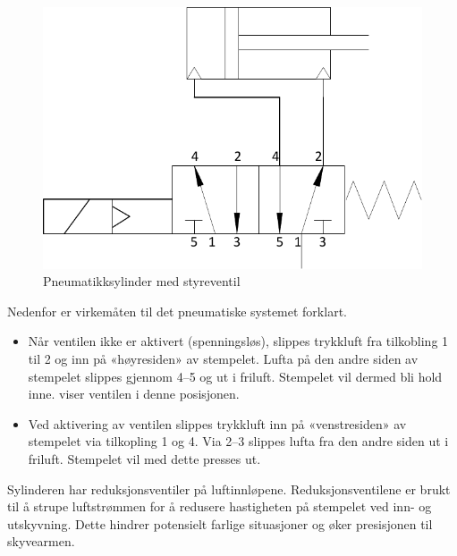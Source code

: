 \documentclass[Visionprosjekt.tex]{subfiles}
\begin{document}
\begin{figure}[ht]
\centering
		\includegraphics[scale=0.7]{bilder/luftstyring.pdf}
	\caption{Pneumatikksylinder med styreventil}
	\label{fig:luftvent}
\end{figure}







\newpage
Nedenfor er virkemåten til det pneumatiske systemet forklart.
\begin{itemize}
	\item Når ventilen ikke er aktivert (spenningsløs), slippes trykkluft fra tilkobling 1 til 2 og inn på «høyresiden» av stempelet. Lufta på den andre siden av stempelet slippes gjennom 4--5 og ut i friluft. Stempelet vil dermed bli hold inne.  viser ventilen i denne posisjonen.
  \item  Ved aktivering av ventilen slippes trykkluft inn på «venstresiden» av stempelet via tilkopling 1 og 4. Via 2--3 slippes lufta fra den andre siden  ut i friluft. Stempelet vil med dette presses ut. 
\end{itemize}

Sylinderen har reduksjonsventiler på luftinnløpene. Reduksjonsventilene er brukt til å strupe luftstrømmen for å redusere hastigheten på stempelet ved inn- og utskyvning. Dette hindrer potensielt farlige situasjoner og øker presisjonen til skyvearmen.
\end{document}
